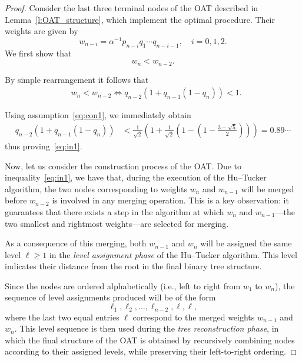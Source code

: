 \documentclass[12pt]{article}
\begin{document}
\begin{proof}
Consider the last three terminal nodes of the OAT described in Lemma~\ref{l:OAT_structure}, which implement the optimal procedure. Their weights are given by
\[
w_{n-i} = \alpha^{-1} p_{n-i} q_1 \cdots q_{n-i-1}, \quad i = 0, 1, 2.
\]
We first show that
\begin{equation}
\label{eq:in1}
w_n < w_{n-2}.
\end{equation}

By simple rearrangement it follows that
\begin{align*}\label{e:condition_on_last_weights}
&
w_n<w_{n-2}\Longleftrightarrow
    q_{n-2}(1+q_{n-1}(1-q_n))<1.
\end{align*}

Using assumption~\eqref{eq:con1}, we immediately obtain
\begin{align*}
q_{n-2}\left(1 + q_{n-1}(1 - q_n)\right)
&< \frac{1}{\sqrt{2}} \left(1 + \frac{1}{\sqrt{2}}\left(1 - \left(1 - \frac{3 - \sqrt{5}}{2}\right)\right)\right)=0.89\cdots
\end{align*}
thus proving~\eqref{eq:in1}.


Now, let us consider the construction process of the OAT. Due to inequality~\eqref{eq:in1}, we have that, during the execution of the Hu--Tucker algorithm, the two nodes corresponding to weights \( w_n \) and \( w_{n-1} \) will be merged before \( w_{n-2} \) is involved in any merging operation. This is a key observation: it guarantees that there exists a step in the algorithm at which \( w_n \) and \( w_{n-1} \)---the two smallest and rightmost weights---are selected for merging.

As a consequence of this merging, both \( w_{n-1} \) and \( w_n \) will be assigned the same level \( \ell \geq 1 \) in the \emph{level assignment phase} of the Hu--Tucker algorithm. This level indicates their distance from the root in the final binary tree structure.

Since the nodes are ordered alphabetically (i.e., left to right from \( w_1 \) to \( w_n \)), the sequence of level assignments produced will be of the form
\[
\ell_1, \ell_2, \dots, \ell_{n-2}, \ell, \ell,
\]
where the last two equal entries \( \ell \) correspond to the merged weights \( w_{n-1} \) and \( w_n \). This level sequence is then used during the \emph{tree reconstruction phase}, in which the final structure of the OAT is obtained by recursively combining nodes according to their assigned levels, while preserving their left-to-right ordering.


\end{proof}
\end{document}
